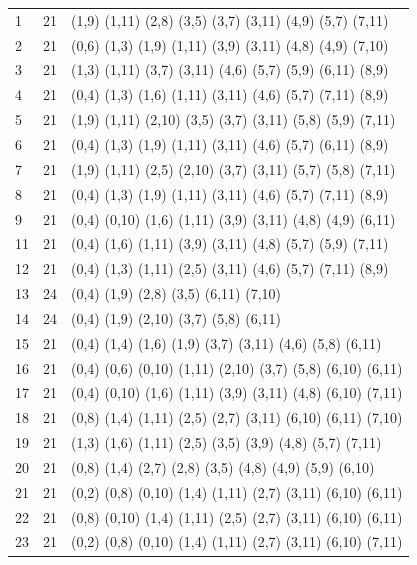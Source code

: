 \begin{appendix}
{\begin{longtable}{lll}
\bottomrule \endfoot

1  & 21 & (1,9)   (1,11) (2,8)  (3,5)   (3,7)   (3,11)  (4,9)   (5,7)   (7,11)  \\
2  & 21 & (0,6)   (1,3)  (1,9)  (1,11)  (3,9)   (3,11)  (4,8)   (4,9)   (7,10)\\
3  & 21 & (1,3)   (1,11) (3,7)  (3,11)  (4,6)   (5,7)   (5,9)   (6,11)  (8,9)\\
4  & 21 & (0,4)   (1,3)  (1,6)  (1,11)  (3,11)  (4,6)   (5,7)   (7,11)  (8,9)\\
5  & 21 & (1,9)   (1,11) (2,10) (3,5)   (3,7)   (3,11)  (5,8)   (5,9)   (7,11)\\
6  & 21 & (0,4)   (1,3)  (1,9)  (1,11)  (3,11)  (4,6)   (5,7)   (6,11)  (8,9)\\
7  & 21 & (1,9)   (1,11) (2,5)  (2,10)  (3,7)   (3,11)  (5,7)   (5,8)   (7,11)\\
8  & 21 & (0,4)   (1,3)  (1,9)  (1,11)  (3,11)  (4,6)   (5,7)   (7,11)  (8,9)\\
9  & 21 & (0,4)   (0,10) (1,6)  (1,11)  (3,9)   (3,11)  (4,8)   (4,9)   (6,11)\\
11 & 21 & (0,4)   (1,6)  (1,11) (3,9)   (3,11)  (4,8)   (5,7)   (5,9)   (7,11)\\
12 & 21 & (0,4)   (1,3)  (1,11) (2,5)   (3,11)  (4,6)   (5,7)   (7,11)  (8,9)\\
13 & 24 & (0,4)   (1,9)  (2,8)  (3,5)   (6,11)  (7,10)          \\
14 & 24 & (0,4)   (1,9)  (2,10) (3,7)   (5,8)   (6,11)          \\
15 & 21 & (0,4)   (1,4)  (1,6)  (1,9)   (3,7)   (3,11)  (4,6)   (5,8)   (6,11)\\
16 & 21 & (0,4)   (0,6)  (0,10) (1,11)  (2,10)  (3,7)   (5,8)   (6,10)  (6,11)\\
17 & 21 & (0,4)   (0,10) (1,6)  (1,11)  (3,9)   (3,11)  (4,8)   (6,10)  (7,11)\\
18 & 21 & (0,8)   (1,4)  (1,11) (2,5)   (2,7)   (3,11)  (6,10)  (6,11)  (7,10)\\
19 & 21 & (1,3)   (1,6)  (1,11) (2,5)   (3,5)   (3,9)   (4,8)   (5,7)   (7,11)\\
20 & 21 & (0,8)   (1,4)  (2,7)  (2,8)   (3,5)   (4,8)   (4,9)   (5,9)   (6,10)\\
21 & 21 & (0,2)   (0,8)  (0,10) (1,4)   (1,11)  (2,7)   (3,11)  (6,10)  (6,11)\\
22 & 21 & (0,8)   (0,10) (1,4)  (1,11)  (2,5)   (2,7)   (3,11)  (6,10)  (6,11)\\
23 & 21 & (0,2)   (0,8)  (0,10) (1,4)   (1,11)  (2,7)   (3,11)  (6,10)  (7,11)\\

\end{longtable}}
\end{appendix}
